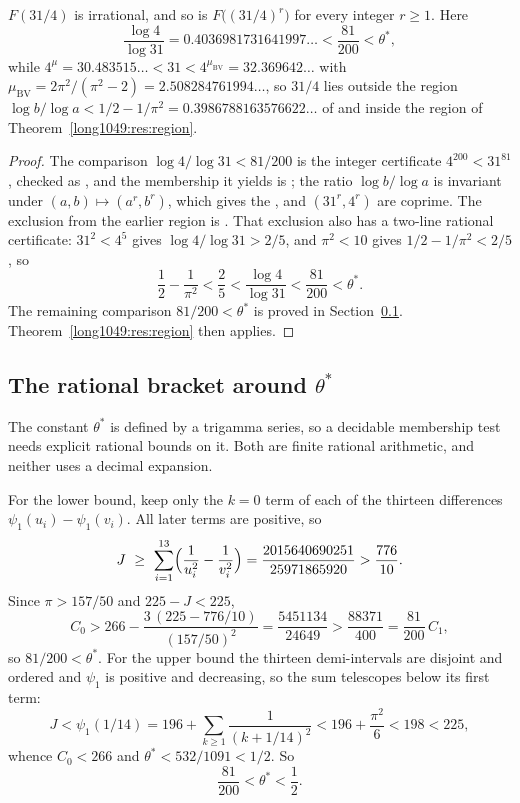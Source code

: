\begin{theorem}\label{long1049:res:31over4}
$F(31/4)$ is irrational, and so is $F\bigl((31/4)^{r}\bigr)$ for every integer
$r\ge1$.  Here
\[
 \frac{\log4}{\log31}=0.4036981731641997\ldots<\frac{81}{200}<\theta^{*},
\]
while $4^{\mu}=30.483515\ldots<31<4^{\mu_{\mathrm{BV}}}=32.369642\ldots$ with
$\mu_{\mathrm{BV}}=2\pi^{2}/(\pi^{2}-2)=2.508284761994\ldots$, so $31/4$ lies
outside the region $\log b/\log a<1/2-1/\pi^{2}=0.3986788163576622\ldots$ of
\cite[Thm.~2, p.~177]{bv1994} and inside the region of
Theorem~\ref{long1049:res:region}.
\end{theorem}

\begin{proof}
The comparison $\log4/\log31<81/200$ is the integer certificate
$4^{200}<31^{81}$, checked as
, and the membership it yields is
;
the ratio $\log b/\log a$ is invariant under $(a,b)\mapsto(a^{r},b^{r})$, which
gives the
, and $(31^{r},4^{r})$ are coprime.  The exclusion from the earlier
region is
.
That exclusion also has a two-line rational certificate: $31^{2}<4^{5}$ gives
$\log4/\log31>2/5$, and $\pi^{2}<10$ gives $1/2-1/\pi^{2}<2/5$, so
\[
 \frac12-\frac1{\pi^{2}}<\frac25<\frac{\log4}{\log31}<\frac{81}{200}<\theta^{*}.
\]
The remaining comparison $81/200<\theta^{*}$ is proved in
Section~\ref{long1049:sec:regionbracket}.  Theorem~\ref{long1049:res:region} then applies.
\end{proof}

\subsection{The rational bracket around \texorpdfstring{$\theta^{*}$}{theta*}}\label{long1049:sec:regionbracket}

The constant $\theta^{*}$ is defined by a trigamma series, so a decidable
membership test needs explicit rational bounds on it.  Both are finite rational
arithmetic, and neither uses a decimal expansion.

For the lower bound, keep only the $k=0$ term of each of the thirteen
differences $\psi_1(u_i)-\psi_1(v_i)$.  All later terms are positive, so
\[
 J\ \ge\ \sum_{i=1}^{13}\Bigl(\frac1{u_i^{2}}-\frac1{v_i^{2}}\Bigr)
  =\frac{2015640690251}{25971865920}
  >\frac{776}{10}.
\]
Since $\pi>157/50$ and $225-J<225$,
\[
 C_0>266-\frac{3\,(225-776/10)}{(157/50)^{2}}=\frac{5451134}{24649}
 >\frac{88371}{400}=\frac{81}{200}\,C_1,
\]
so $81/200<\theta^{*}$.  For the upper bound the thirteen demi-intervals are
disjoint and ordered and $\psi_1$ is positive and decreasing, so the sum
telescopes below its first term:
\[
 J<\psi_1(1/14)=196+\sum_{k\ge1}\frac1{(k+1/14)^{2}}<196+\frac{\pi^{2}}6<198<225,
\]
whence $C_0<266$ and $\theta^{*}<532/1091<1/2$.  So
\[
 \frac{81}{200}<\theta^{*}<\frac12 .
\]

